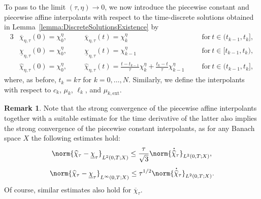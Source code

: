 \documentclass[a4paper,12pt]{article}
\newcommand{\ext}{\mathrm{ext}}
\newcommand{\wh}{\widehat}
\newcommand{\ubar}{\underline}
\newcommand{\chibar}{\overline{\chi}}
\newcommand{\chihat}{\widehat{\chi}}
\newcommand\DT[1]{\mathchoice
                 {{\buildrel{\hspace*{.1em}\text{\LARGE.}}\over{#1}}}
                 {{\buildrel{\hspace*{.1em}\text{\Large.}}\over{#1}}}
                 {{\buildrel{\hspace*{.1em}\text{\large.}}\over{#1}}}
                 {{\buildrel{\hspace*{.1em}\text{\large.}}\over{#1}}}}
\renewcommand{\dot}{\DT}
\theoremstyle{plain}
\theoremstyle{definition}
\newtheorem{Rem}[Th]{Remark}
\numberwithin{equation}{section}
\begin{document}
To pass to the limit $(\tau,\eta) \to 0$, 
we now introduce the piecewise constant and piecewise affine interpolants
with respect to the time-discrete solutions obtained in Lemma~\ref{lemma:DiscreteSolutionsExistence}
by 
\begin{alignat}{3}
    &\chibar_{\eta,\tau}(0) = \chi_0^\eta, &&\chibar_{\eta,\tau}(t) = \chi_k^\eta && \text{for}\ t\in(t_{k-1},t_k], \\
    &\ubar\chi _{\eta,\tau}(0) = \chi_0^\eta, &&\ubar\chi_{\eta,\tau}(t) = \chi_{k-1}^\eta && \text{for}\ t\in[t_{k-1},t_k), \\
    &\chihat_{\eta,\tau}(0) = \chi_0^\eta,\hspace{10pt} 
        &&\chihat_{\eta,\tau}(t) = \frac{t-t_{k-1}}{\tau}\chi_k^\eta + \frac{t_k-t}{\tau}\chi_{k-1}^\eta\hspace{10pt} 
        && \text{for}\ t\in(t_{k-1},t_k], 
\end{alignat} 
	where, as before, $t_k=k\tau$ for $k=0,\ldots, N$. Similarly, we define the interpolants with respect to $c_k$, $\mu_k$, $\ell_k$,
	and $\mu_{k,\ext}$. 
%
	
	\begin{Rem}
		\label{Rem:TimeDisc:InterpolantEstimates}
		Note that the strong convergence of the piecewise affine interpolants together with a suitable estimate for the time derivative of the latter also implies the strong convergence of the piecewise constant interpolants, as for any Banach space $X$ the following estimates hold:%
		\begin{equation}
		\label{Eqn:TimeDisc:InterpolantEstimateL2}
		\norm{\wh \chi_\tau - \ubar\chi_\tau}_{L^2(0,T;X)} \leq \frac{\tau}{\sqrt{3}}\norm{\dot\chihat_\tau}_{L^2(0,T;X)},
		\end{equation}
		\begin{equation}
		\label{Eqn:TimeDisc:InterpolantEstimateLinfty}
		\norm{\wh \chi_\tau - \ubar\chi_\tau}_{L^\infty(0,T;X)} \leq \tau^{1/2}\norm{\dot\chihat_\tau}_{L^2(0,T;X)}.
		\end{equation}
		Of course, similar estimates also hold for $\chibar_\tau$.
	\end{Rem}
	
\end{document}
